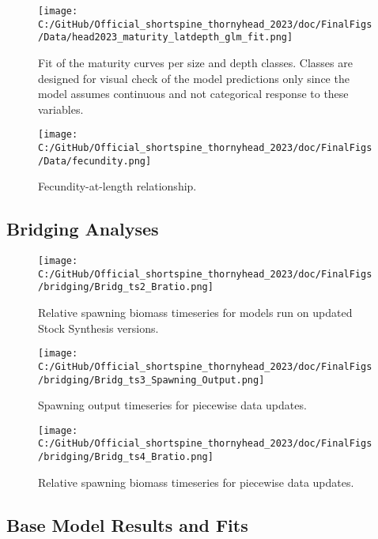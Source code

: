 \documentclass[11pt,
  english,
  letterpaper,
]{article}
\begin{document}
\begin{figure}
\centering
\texttt{[image: C:/GitHub/Official\_shortspine\_thornyhead\_2023/doc/FinalFigs/Data/head2023\_maturity\_latdepth\_glm\_fit.png]}
\caption{Fit of the maturity curves per size and depth classes. Classes are designed for visual check of the model predictions only since the model assumes continuous and not categorical response to these variables.\label{fig:mat1}}
\end{figure}

\begin{figure}
\centering
\texttt{[image: C:/GitHub/Official\_shortspine\_thornyhead\_2023/doc/FinalFigs/Data/fecundity.png]}
\caption{Fecundity-at-length relationship.\label{fig:fec}}
\end{figure}

\clearpage

\hypertarget{bridging-analyses}{%
\subsection{Bridging Analyses}\label{bridging-analyses}}

\begin{figure}
\centering
\texttt{[image: C:/GitHub/Official\_shortspine\_thornyhead\_2023/doc/FinalFigs/bridging/Bridg\_ts2\_Bratio.png]}
\caption{Relative spawning biomass timeseries for models run on updated Stock Synthesis versions.\label{fig:bridge_bratio}}
\end{figure}

\begin{figure}
\centering
\texttt{[image: C:/GitHub/Official\_shortspine\_thornyhead\_2023/doc/FinalFigs/bridging/Bridg\_ts3\_Spawning\_Output.png]}
\caption{Spawning output timeseries for piecewise data updates.\label{fig:bridge_spawnout_data}}
\end{figure}

\begin{figure}
\centering
\texttt{[image: C:/GitHub/Official\_shortspine\_thornyhead\_2023/doc/FinalFigs/bridging/Bridg\_ts4\_Bratio.png]}
\caption{Relative spawning biomass timeseries for piecewise data updates.\label{fig:bridge_bratio_data}}
\end{figure}

\clearpage

\hypertarget{base-model-results-and-fits}{%
\subsection{Base Model Results and Fits}\label{base-model-results-and-fits}}
\end{document}
